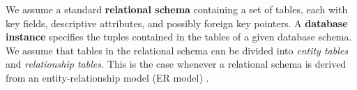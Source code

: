 \documentclass{vldb}
\begin{document}
 We assume a standard \textbf{relational schema} containing a set of tables, each with key fields, %
descriptive attributes, and possibly foreign key pointers. 
A \textbf{database instance} specifies the tuples contained in the tables of a given database schema. 
We assume that tables in the relational schema can be divided into {\em entity tables} and {\em relationship tables.} 
This is the case whenever a relational schema is derived from an entity-relationship model (ER model) \cite[Ch.2.2]{Ullman1982}. 


%
%
%
% 
%
\end{document}
